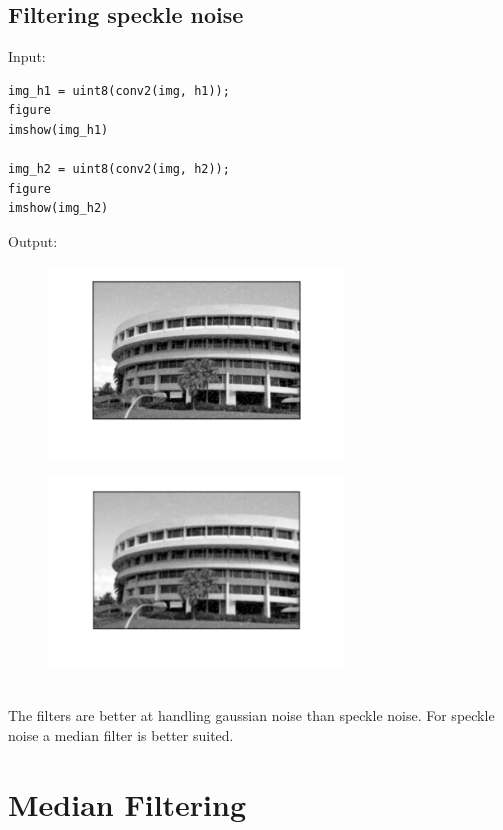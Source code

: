 \documentclass[12pt, a4paper]{article}
\begin{document}
\subsection{Filtering speckle noise}
Input:
\begin{verbatim}
img_h1 = uint8(conv2(img, h1));
figure
imshow(img_h1)

img_h2 = uint8(conv2(img, h2));
figure
imshow(img_h2)
\end{verbatim}
Output:
\begin{figure}[H]
    \centering
    \includegraphics[width=0.7\textwidth]{fig15.png}
\end{figure}
\begin{figure}[H]
    \centering
    \includegraphics[width=0.7\textwidth]{fig16.png}
\end{figure}
~\\
The filters are better at handling gaussian noise than speckle noise. For speckle noise a median filter is better suited.

\section{Median Filtering}
\end{document}
